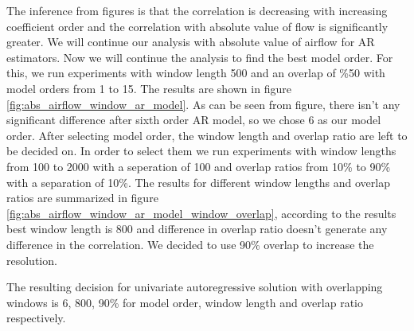The inference from figures  is that the correlation is decreasing with increasing coefficient order and the correlation with absolute value of flow is significantly greater. We will continue our analysis with absolute value of airflow for AR estimators. Now we will continue the analysis to find the best model order. For this, we run experiments with window length 500 and an overlap of \%50 with model orders from 1 to 15. The results are shown in figure \ref{fig:abs_airflow_window_ar_model}. As can be seen from figure, there isn't any significant difference after sixth order AR model, so we chose 6 as our model order. After selecting model order, the window length and overlap ratio are left to be decided on. In order to select them we run experiments with window lengths from 100 to 2000 with a seperation of 100 and overlap ratios from 10\% to 90\% with a separation of 10\%. The results for different window lengths and overlap ratios are summarized in figure \ref{fig:abs_airflow_window_ar_model_window_overlap}, according to the results best window length is 800 and difference in overlap ratio doesn't generate any difference in the correlation. We decided to use 90\% overlap to increase the resolution. \par
The resulting decision for univariate autoregressive solution with overlapping windows is 6, 800, 90\% for model order, window length and overlap ratio respectively. 
